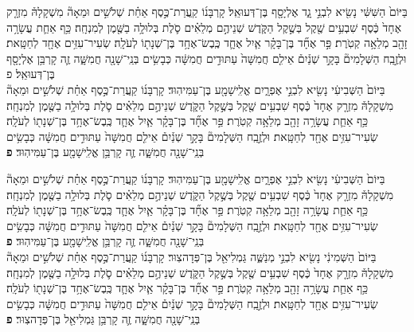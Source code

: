 \documentclass[twoside, openany, parskip=half, 11pt]{book}
\begin{document}
\begin{footnotesize}
\begin{multicols}{2}
בַּיּוֹם֙ הַשִּׁשִּׁ֔י נָשִׂ֖יא לִבְנֵ֣י גָ֑ד אֶלְיָסָ֖ף בֶּן־דְּעוּאֵֽל׃ קָרְבָּנ֜וֹ קַֽעֲרַת־כֶּ֣סֶף אַחַ֗ת שְׁלֹשִׁ֣ים וּמֵאָה֘ מִשְׁקָלָהּ֒ מִזְרָ֤ק אֶחָד֙ כֶּ֔סֶף שִׁבְעִ֥ים שֶׁ֖קֶל בְּשֶׁ֣קֶל הַקֹּ֑דֶשׁ שְׁנֵיהֶ֣ם מְלֵאִ֗ים סֹ֛לֶת בְּלוּלָ֥ה בַשֶּׁ֖מֶן לְמִנְחָֽה׃ כַּ֥ף אַחַ֛ת עֲשָׂרָ֥ה זָהָ֖ב מְלֵאָ֥ה קְטֹֽרֶת׃   פַּ֣ר אֶחָ֞ד בֶּן־בָּקָ֗ר אַ֧יִל אֶחָ֛ד כֶּֽבֶשׂ־אֶחָ֥ד בֶּן־שְׁנָת֖וֹ לְעֹלָֽה׃ שְׂעִיר־עִזִּ֥ים אֶחָ֖ד לְחַטָּֽאת׃ וּלְזֶ֣בַֽח הַשְּׁלָמִים֘ בָּקָ֣ר שְׁנַ֒יִם֒ אֵילִ֤ם חֲמִשָּׁה֙ עַתּוּדִ֣ים חֲמִשָּׁ֔ה כְּבָשִׂ֥ים בְּנֵֽי־שָׁנָ֖ה חֲמִשָּׁ֑ה זֶ֛ה קָרְבַּ֥ן אֶלְיָסָ֖ף בֶּן־דְּעוּאֵֽל׃ פ\\
  בַּיּוֹם֙ הַשְּׁבִיעִ֔י נָשִׂ֖יא לִבְנֵ֣י אֶפְרָ֑יִם אֱלִֽישָׁמָ֖ע בֶּן־עַמִּיהֽוּד׃ קָרְבָּנ֜וֹ קַֽעֲרַת־כֶּ֣סֶף אַחַ֗ת שְׁלֹשִׁ֣ים וּמֵאָה֘ מִשְׁקָלָהּ֒ מִזְרָ֤ק אֶחָד֙ כֶּ֔סֶף שִׁבְעִ֥ים שֶׁ֖קֶל בְּשֶׁ֣קֶל הַקֹּ֑דֶשׁ שְׁנֵיהֶ֣ם מְלֵאִ֗ים סֹ֛לֶת בְּלוּלָ֥ה בַשֶּׁ֖מֶן לְמִנְחָֽה׃ כַּ֥ף אַחַ֛ת עֲשָׂרָ֥ה זָהָ֖ב מְלֵאָ֥ה קְטֹֽרֶת׃ פַּ֣ר אֶחָ֞ד בֶּן־בָּקָ֗ר אַ֧יִל אֶחָ֛ד כֶּֽבֶשׂ־אֶחָ֥ד בֶּן־שְׁנָת֖וֹ לְעֹלָֽה׃ שְׂעִיר־עִזִּ֥ים אֶחָ֖ד לְחַטָּֽאת׃ וּלְזֶ֣בַֽח הַשְּׁלָמִים֘ בָּקָ֣ר שְׁנַ֒יִם֒ אֵילִ֤ם חֲמִשָּׁה֙ עַתּוּדִ֣ים חֲמִשָּׁ֔ה כְּבָשִׂ֥ים בְּנֵֽי־שָׁנָ֖ה חֲמִשָּׁ֑ה זֶ֛ה קָרְבַּ֥ן אֱלִֽישָׁמָ֖ע בֶּן־עַמִּיהֽוּד׃ \textbf{פ} 
 
 
בַּיּוֹם֙ הַשְּׁבִיעִ֔י נָשִׂ֖יא לִבְנֵ֣י אֶפְרָ֑יִם אֱלִֽישָׁמָ֖ע בֶּן־עַמִּיהֽוּד׃ קָרְבָּנ֜וֹ קַֽעֲרַת־כֶּ֣סֶף אַחַ֗ת שְׁלֹשִׁ֣ים וּמֵאָה֘ מִשְׁקָלָהּ֒ מִזְרָ֤ק אֶחָד֙ כֶּ֔סֶף שִׁבְעִ֥ים שֶׁ֖קֶל בְּשֶׁ֣קֶל הַקֹּ֑דֶשׁ שְׁנֵיהֶ֣ם מְלֵאִ֗ים סֹ֛לֶת בְּלוּלָ֥ה בַשֶּׁ֖מֶן לְמִנְחָֽה׃ כַּ֥ף אַחַ֛ת עֲשָׂרָ֥ה זָהָ֖ב מְלֵאָ֥ה קְטֹֽרֶת׃   פַּ֣ר אֶחָ֞ד בֶּן־בָּקָ֗ר אַ֧יִל אֶחָ֛ד כֶּֽבֶשׂ־אֶחָ֥ד בֶּן־שְׁנָת֖וֹ לְעֹלָֽה׃ שְׂעִיר־עִזִּ֥ים אֶחָ֖ד לְחַטָּֽאת׃ וּלְזֶ֣בַֽח הַשְּׁלָמִים֘ בָּקָ֣ר שְׁנַ֒יִם֒ אֵילִ֤ם חֲמִשָּׁה֙ עַתּוּדִ֣ים חֲמִשָּׁ֔ה כְּבָשִׂ֥ים בְּנֵֽי־שָׁנָ֖ה חֲמִשָּׁ֑ה זֶ֛ה קָרְבַּ֥ן אֱלִֽישָׁמָ֖ע בֶּן־עַמִּיהֽוּד׃ \textbf{פ} \\
  בַּיּוֹם֙ הַשְּׁמִינִ֔י נָשִׂ֖יא לִבְנֵ֣י מְנַשֶּׁ֑ה גַּמְלִיאֵ֖ל בֶּן־פְּדָהצֽוּר׃ קָרְבָּנ֜וֹ קַֽעֲרַת־כֶּ֣סֶף אַחַ֗ת שְׁלֹשִׁ֣ים וּמֵאָה֘ מִשְׁקָלָהּ֒ מִזְרָ֤ק אֶחָד֙ כֶּ֔סֶף שִׁבְעִ֥ים שֶׁ֖קֶל בְּשֶׁ֣קֶל הַקֹּ֑דֶשׁ שְׁנֵיהֶ֣ם מְלֵאִ֗ים סֹ֛לֶת בְּלוּלָ֥ה בַשֶּׁ֖מֶן לְמִנְחָֽה׃ כַּ֥ף אַחַ֛ת עֲשָׂרָ֥ה זָהָ֖ב מְלֵאָ֥ה קְטֹֽרֶת׃ פַּ֣ר אֶחָ֞ד בֶּן־בָּקָ֗ר אַ֧יִל אֶחָ֛ד כֶּֽבֶשׂ־אֶחָ֥ד בֶּן־שְׁנָת֖וֹ לְעֹלָֽה׃ שְׂעִיר־עִזִּ֥ים אֶחָ֖ד לְחַטָּֽאת׃ וּלְזֶ֣בַֽח הַשְּׁלָמִים֘ בָּקָ֣ר שְׁנַ֒יִם֒ אֵילִ֤ם חֲמִשָּׁה֙ עַתּוּדִ֣ים חֲמִשָּׁ֔ה כְּבָשִׂ֥ים בְּנֵֽי־שָׁנָ֖ה חֲמִשָּׁ֑ה זֶ֛ה קָרְבַּ֥ן גַּמְלִיאֵ֖ל בֶּן־פְּדָהצֽוּר׃ \textbf{פ} 



\end{multicols}
\end{footnotesize}
\end{document}
